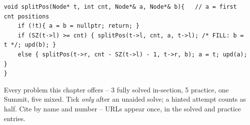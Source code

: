 \begin{lstlisting}[caption={Drill 5 -- implicit split by position (from \coderef{c06-split})}]
void splitPos(Node* t, int cnt, Node*& a, Node*& b){   // a = first cnt positions
    if (!t){ a = b = nullptr; return; }
    if (SZ(t->l) >= cnt) { splitPos(t->l, cnt, a, t->l); /* FILL: b = t */; upd(b); }
    else { splitPos(t->r, cnt - SZ(t->l) - 1, t->r, b); a = t; upd(a); }
}
\end{lstlisting}


Every problem this chapter offers -- 3 fully solved in-section, 5 practice, one Summit, five mixed.
Tick \emph{only} after an unaided solve; a hinted attempt counts as half. Cite by name and number --
URLs appear once, in the solved and practice entries.

